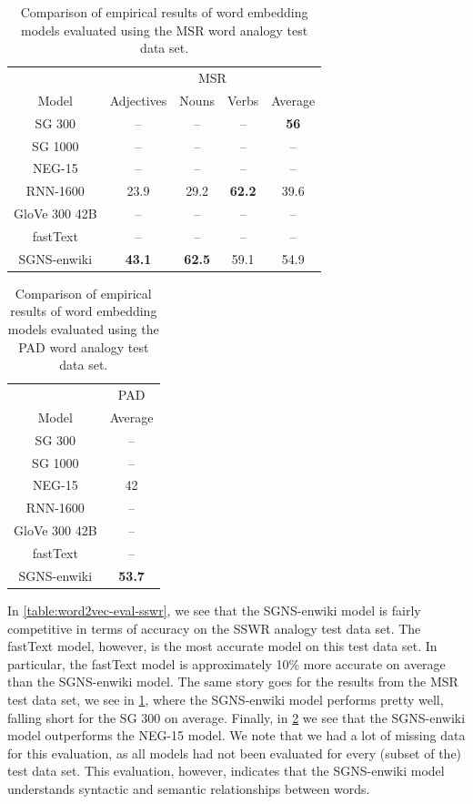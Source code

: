 \begin{table}[H]
     \centering
    \begin{tabular}{@{}ccccc@{}}
    \toprule
    & \multicolumn{4}{c}{MSR} \\
    \cmidrule(l){2-5} 
    \multirow{-2}{*}{Model} & Adjectives & Nouns & Verbs & Average \\
    \midrule
    \trcolor
    SG 300 & -- & -- & -- & \textbf{56} \\
    SG 1000 & -- & -- & -- & -- \\
    \trcolor
    NEG-15 & -- & -- & -- & -- \\
    RNN-1600 & 23.9 & 29.2 & \textbf{62.2} & 39.6 \\
    \trcolor
    GloVe 300 42B & -- & -- & -- & -- \\
    fastText & -- & -- & -- & -- \\
    \trcolor
    SGNS-enwiki & \textbf{43.1} & \textbf{62.5} & 59.1 & 54.9 \\
    \bottomrule
    \end{tabular}
    \caption{Comparison of empirical results of word embedding models evaluated using the MSR word analogy test data set.}
    \label{table:word2vec-eval-msr}
\end{table}
\begin{table}[H]
    \centering
    \begin{tabular}{@{}cc@{}}
    \toprule
    & PAD \\
    \cmidrule(l){2-2}
    \multirow{-2}{*}{Model} & Average \\
    \midrule
    \trcolor
    SG 300 & -- \\
    SG 1000 & -- \\
    \trcolor
    NEG-15 & 42 \\
    RNN-1600 & -- \\
    \trcolor
    GloVe 300 42B & -- \\
    fastText & -- \\
    \trcolor
    SGNS-enwiki & \textbf{53.7} \\
    \bottomrule
    \end{tabular}
    \caption{Comparison of empirical results of word embedding models evaluated using the PAD word analogy test data set.}
    \label{table:word2vec-eval-pad}
\end{table}

In \cref{table:word2vec-eval-sswr}, we see that the SGNS-enwiki model is fairly competitive in terms of accuracy on the SSWR analogy test data set. The fastText model, however, is the most accurate model on this test data set. In particular, the fastText model is approximately 10\% more accurate on average than the SGNS-enwiki model. The same story goes for the results from the MSR test data set, we see in \cref{table:word2vec-eval-msr}, where the SGNS-enwiki model performs pretty well, falling short for the SG 300 on average. Finally, in \cref{table:word2vec-eval-pad} we see that the SGNS-enwiki model outperforms the NEG-15 model. We note that we had a lot of missing data for this evaluation, as all models had not been evaluated for every (subset of the) test data set. This evaluation, however, indicates that the SGNS-enwiki model understands syntactic and semantic relationships between words.

